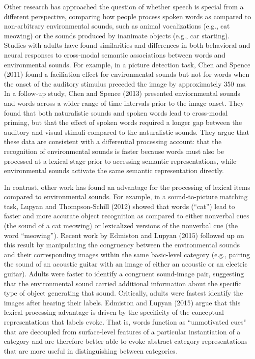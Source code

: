 \documentclass[english,floatsintext,man]{apa6}
\theoremstyle{definition}
\theoremstyle{definition}
\theoremstyle{definition}
\theoremstyle{remark}
\begin{document}
Other research has approached the question of whether speech is special
from a different perspective, comparing how people process spoken words
as compared to non-arbitrary environmental sounds, such as animal
vocalizations (e.g., cat meowing) or the sounds produced by inanimate
objects (e.g., car starting). Studies with adults have found
similarities and differences in both behavioral and neural responses to
cross-modal semantic associations between words and environmental
sounds. For example, in a picture detection task, Chen and Spence (2011)
found a faciliation effect for environmental sounds but not for words
when the onset of the auditory stimulus preceded the image by
approximately 350 ms. In a follow-up study, Chen and Spence (2013)
presented enviornmental sounds and words across a wider range of time
intervals prior to the image onset. They found that both naturalistic
sounds and spoken words lead to cross-modal priming, but that the effect
of spoken words required a longer gap between the auditory and visual
stimuli compared to the naturalistic sounds. They argue that these data
are consistent with a differential processing account: that the
recognition of environmental sounds is faster because words must also be
processed at a lexical stage prior to accessing semantic
representations, while environmental sounds activate the same semantic
representation directly.

In contrast, other work has found an advantage for the processing of
lexical items compared to environmental sounds. For example, in a
sound-to-picture matching task, Lupyan and Thompson-Schill (2012) showed
that words (\enquote{cat}) lead to faster and more accurate object
recognition as compared to either nonverbal cues (the sound of a cat
meowing) or lexicalized versions of the nonverbal cue (the word
\enquote{meowing}). Recent work by Edmiston and Lupyan (2015) followed
up on this result by manipulating the congruency between the
environmental sounds and their corresponding images within the same
basic-level category (e.g., pairing the sound of an acoustic guitar with
an image of either an acoustic or an electric guitar). Adults were
faster to identify a congruent sound-image pair, suggesting that the
environmental sound carried additional information about the specific
type of object generating that sound. Critically, adults were fastest
identify the images after hearing their labels. Edmiston and Lupyan
(2015) argue that this lexical processing advantage is driven by the
specificity of the conceptual representations that labels evoke. That
is, words function as \enquote{unmotivated cues} that are decoupled from
surface-level features of a particular instantiation of a category and
are therefore better able to evoke abstract category representations
that are more useful in distinguishing between categories.
\end{document}
